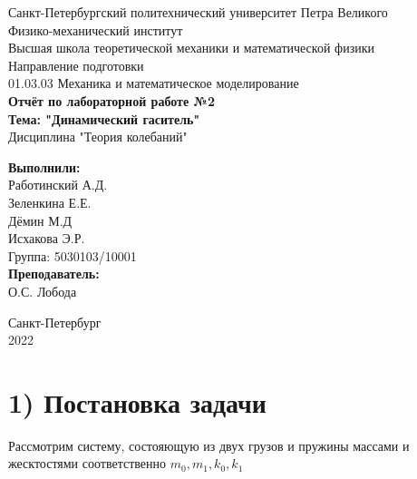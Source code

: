 \documentclass[]{article}
\begin{document}
	\begin{titlepage}
		\begin{center}
			\large Санкт-Петербургский политехнический университет Петра Великого \\
			\large Физико-механический институт \\
			\large Высшая школа теоретической механики и математической физики \\[2cm] %
			\large Направление подготовки \\
			\large 01.03.03 Механика и математическое моделирование \\[2cm]
			\LARGE \textbf {Отчёт по лабораторной работе №2} \\[0.5cm]
			\LARGE \textbf {Тема: "Динамический гаситель"} \\[0.5cm]
			\large Дисциплина "Теория колебаний" \\[4cm]
		\end{center}
		\begin{minipage}{0.25\textwidth} %
			\begin{flushright}
				\large\textbf{Выполнили:}\\
				\large Работинский А.Д. \\
				\large Зеленкина Е.Е. \\
				\large Дёмин М.Д\\
				\large Исхакова Э.Р. \\
				\large {Группа:} 5030103/10001 \\
				\large \textbf{Преподаватель:}\\
				\large О.С. Лобода
			\end{flushright}
		\end{minipage}
		\mbox{}
		\vfill
		\begin{center}
			\large Санкт-Петербург \\
			\large 2022 
		\end{center} 
	\end{titlepage}
	
	\newpage
	\section*{1) Постановка задачи}
	Рассмотрим систему, состояющую из двух грузов и пружины массами и жесктостями соответственно $m_0, m_1, k_0,k_1$
	
\end{document}
